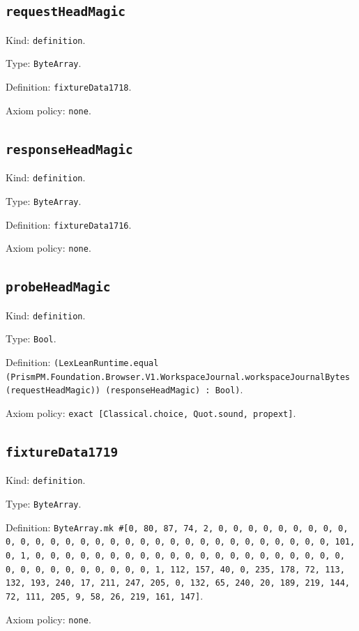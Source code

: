 \documentclass[11pt]{article}
\begin{document}
\subsection*{\texttt{requestHeadMagic}}
\noindent Kind: \texttt{definition}.\par
\noindent Type: \texttt{ByteArray}.\par
\noindent Definition: \texttt{fixtureData1718}.\par
\noindent Axiom policy: \texttt{none}.\par
\subsection*{\texttt{responseHeadMagic}}
\noindent Kind: \texttt{definition}.\par
\noindent Type: \texttt{ByteArray}.\par
\noindent Definition: \texttt{fixtureData1716}.\par
\noindent Axiom policy: \texttt{none}.\par
\subsection*{\texttt{probeHeadMagic}}
\noindent Kind: \texttt{definition}.\par
\noindent Type: \texttt{Bool}.\par
\noindent Definition: \texttt{(LexLeanRuntime.equal (PrismPM.Foundation.Browser.V1.WorkspaceJournal.workspaceJournalBytes (requestHeadMagic)) (responseHeadMagic) : Bool)}.\par
\noindent Axiom policy: \texttt{exact [Classical.choice, Quot.sound, propext]}.\par
\subsection*{\texttt{fixtureData1719}}
\noindent Kind: \texttt{definition}.\par
\noindent Type: \texttt{ByteArray}.\par
\noindent Definition: \texttt{ByteArray.mk \#[0, 80, 87, 74, 2, 0, 0, 0, 0, 0, 0, 0, 0, 0, 0, 0, 0, 0, 0, 0, 0, 0, 0, 0, 0, 0, 0, 0, 0, 0, 0, 0, 0, 0, 0, 0, 101, 0, 1, 0, 0, 0, 0, 0, 0, 0, 0, 0, 0, 0, 0, 0, 0, 0, 0, 0, 0, 0, 0, 0, 0, 0, 0, 0, 0, 0, 0, 0, 0, 0, 1, 112, 157, 40, 0, 235, 178, 72, 113, 132, 193, 240, 17, 211, 247, 205, 0, 132, 65, 240, 20, 189, 219, 144, 72, 111, 205, 9, 58, 26, 219, 161, 147]}.\par
\noindent Axiom policy: \texttt{none}.\par
\end{document}
